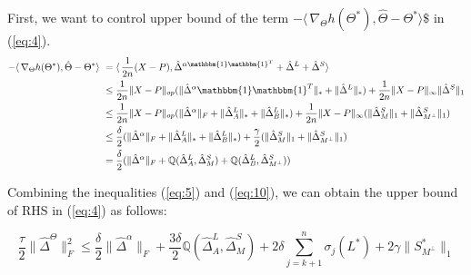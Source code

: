 \documentclass{article}
\begin{document}
First, we want to control upper bound of the term $-\langle\,\nabla_{\Theta}h(\Theta^{*}),\hat{\Theta}-\Theta^{*} \rangle\$$
in (\ref{eq:4}).
\begin{align}
-\langle\,\nabla_{\Theta}h(\Theta^{*}),\hat{\Theta}-\Theta^{*} \rangle\ 
&=\langle\, \frac{1}{2n} (X - P), \hat\Delta^{\alpha\mathbbm{1}\mathbbm{1}^T} + \hat\Delta^{L} + \hat\Delta^{S} \rangle\ \\
&\leq \frac{1}{2n} \|X - P\|_{op}(\|\hat{\Delta}^{\alpha}\mathbbm{1}\mathbbm{1}^T\|_\ast + \|\hat{\Delta}^{L}\|_\ast) +  \frac{1}{2n} \|X - P\|_{\infty}\|\hat{\Delta}^{S}\|_{1} \\
&\leq \frac{1}{2n} \|X - P\|_{op}(\|\hat{\Delta}^{\alpha}\|_{F} + \|\hat{\Delta}^{L}_{A}\|_\ast + \|\hat{\Delta}^{L}_{B}\|_\ast) +
\frac{1}{2n} \|X - P\|_{\infty}(\|\hat{\Delta}^{S}_{M}\|_{1} + 
\|\hat{\Delta}^{S}_{M^{\perp}}\|_{1}) \\ 
&\leq \frac{\delta}{2}(\|\hat{\Delta}^{\alpha}\|_{F} + \|\hat{\Delta}^{L}_{A}\|_\ast + \|\hat{\Delta}^{L}_{B}\|_\ast) + \frac{\gamma}{2}(\|\hat{\Delta}^{S}_{M}\|_{1} + 
\|\hat{\Delta}^{S}_{M^{\perp}}\|_{1}) \\
&= \frac{\delta}{2}(\|\hat{\Delta}^{\alpha}\|_{F} +     \mathbb{Q}(\hat{\Delta}^L_{A},\hat{\Delta}^S_{M}) + \mathbb{Q}(\hat{\Delta}^L_{B},\hat{\Delta}^S_{M^\perp}) ) \label{eq:10}
\end{align}

Combining the inequalities (\ref{eq:5}) and (\ref{eq:10}), we can obtain the upper bound of RHS in (\ref{eq:4}) as follows:

\begin{equation}
    \frac{\tau}{2}\|\hat{\Delta}^{\Theta}\|_{F}^{2} \leq
    \frac{\delta}{2}\|\hat{\Delta}^{\alpha}\|_{F} + 
    \frac{3\delta}{2}\mathbb{Q}(\hat{\Delta}^L_{A},\hat{\Delta}^S_{M})
    +2 \delta \sum_{j=k+1}^{n} \sigma_{j}(L^*) + 2\gamma \|S^*_{M^\perp}\|_{1}
    \label{eq:11}
\end{equation}
\end{document}
